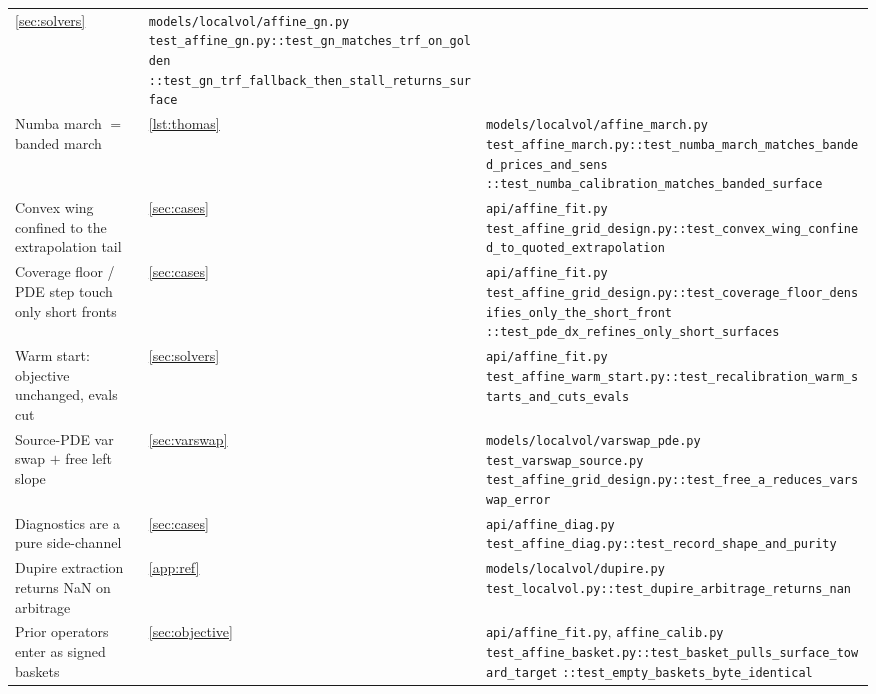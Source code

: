 \documentclass[11pt]{article}
\begin{document}
\begin{longtable}{@{}p{}p{}p{}@{}}
\cref{sec:solvers} &
\nolinkurl{models/localvol/affine_gn.py}\newline
\nolinkurl{test_affine_gn.py::test_gn_matches_trf_on_golden}\newline
\nolinkurl{::test_gn_trf_fallback_then_stall_returns_surface}\\
\addlinespace
Numba march $=$ banded march &
\cref{lst:thomas} &
\nolinkurl{models/localvol/affine_march.py}\newline
\nolinkurl{test_affine_march.py::test_numba_march_matches_banded_prices_and_sens}\newline
\nolinkurl{::test_numba_calibration_matches_banded_surface}\\
\addlinespace
Convex wing confined to the extrapolation tail &
\cref{sec:cases} &
\nolinkurl{api/affine_fit.py}\newline
\nolinkurl{test_affine_grid_design.py::test_convex_wing_confined_to_quoted_extrapolation}\\
\addlinespace
Coverage floor / PDE step touch only short fronts &
\cref{sec:cases} &
\nolinkurl{api/affine_fit.py}\newline
\nolinkurl{test_affine_grid_design.py::test_coverage_floor_densifies_only_the_short_front}\newline
\nolinkurl{::test_pde_dx_refines_only_short_surfaces}\\
\addlinespace
Warm start: objective unchanged, evals cut &
\cref{sec:solvers} &
\nolinkurl{api/affine_fit.py}\newline
\nolinkurl{test_affine_warm_start.py::test_recalibration_warm_starts_and_cuts_evals}\\
\addlinespace
Source-PDE var swap $+$ free left slope &
\cref{sec:varswap} &
\nolinkurl{models/localvol/varswap_pde.py}\newline
\nolinkurl{test_varswap_source.py}\newline
\nolinkurl{test_affine_grid_design.py::test_free_a_reduces_varswap_error}\\
\addlinespace
Diagnostics are a pure side-channel &
\cref{sec:cases} &
\nolinkurl{api/affine_diag.py}\newline
\nolinkurl{test_affine_diag.py::test_record_shape_and_purity}\\
\addlinespace
Dupire extraction returns NaN on arbitrage &
\cref{app:ref} &
\nolinkurl{models/localvol/dupire.py}\newline
\nolinkurl{test_localvol.py::test_dupire_arbitrage_returns_nan}\\
\addlinespace
Prior operators enter as signed baskets &
\cref{sec:objective} &
\nolinkurl{api/affine_fit.py}, \nolinkurl{affine_calib.py}\newline
\nolinkurl{test_affine_basket.py::test_basket_pulls_surface_toward_target}\newline
\nolinkurl{::test_empty_baskets_byte_identical}\\
\bottomrule
\end{longtable}
\endgroup
\end{document}
